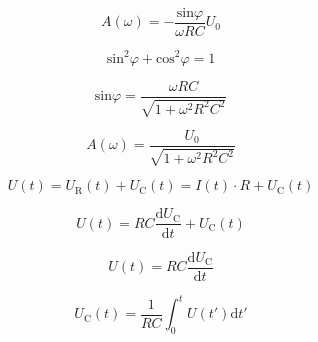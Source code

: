     \begin{equation}
        A(\omega) = - \frac{\text{sin} \varphi}{\omega R C} U_0
    \end{equation}

    \begin{equation}
        \text{sin}^2 \varphi + \text{cos}^2 \varphi = 1
    \end{equation}

    \begin{equation}
        \text{sin} \varphi = \frac{\omega R C}{ \sqrt{1 + \omega^2 R^2 C^2} }
    \end{equation}

    \begin{equation}
        A(\omega) = \frac{U_0}{\sqrt{1 + \omega^2 R^2 C^2}}
    \end{equation}

    \begin{equation}
        U(t) = U_{\text{R}}(t) + U_{\text{C}}(t) = I(t) \cdot R + U_{\text{C}}(t)
    \end{equation}

    \begin{equation}
        U(t) = RC \frac{\text{d}U_{\text{C}}}{\text{d}t} + U_{\text{C}}(t)
    \end{equation}

    \begin{equation}
        U(t) = RC \frac{\text{d}U_{\text{C}}}{\text{d}t}
    \end{equation}

    \begin{equation}
        U_{\text{C}}(t) = \frac{1}{RC} \int_0^t U(t')\text{d}t'
    \end{equation}